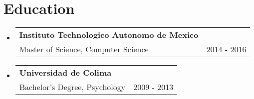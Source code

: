 \documentclass[letterpaper,10.9pt]{article}
\makeatletter
\newcommand{\resumeEducationHeading}[4]{
  \vspace{-2pt}\item
    \begin{tabular*}{0.97\textwidth}[t]{l@{\extracolsep{\fill}}r}
      \textbf{#1} & #2 \\
      \small #3 & \small #4 \\
    \end{tabular*}\vspace{-5pt}
}
\newcommand{\resumeSubHeadingListStart}{\begin{itemize}[leftmargin=0.15in, label={}]}
\newcommand{\resumeSubHeadingListEnd}{\end{itemize}}
\makeatother
\begin{document}

\section{Education}
  \vspace{3pt}
  \resumeSubHeadingListStart
    
    \resumeEducationHeading
      {Instituto Technologico Autonomo de Mexico}{}
      {Master of Science, Computer Science}{2014 - 2016}

    \resumeEducationHeading
      {Universidad de Colima}{}
      {Bachelor’s Degree, Psychology}{2009 - 2013}
    
  \resumeSubHeadingListEnd

\end{document}
